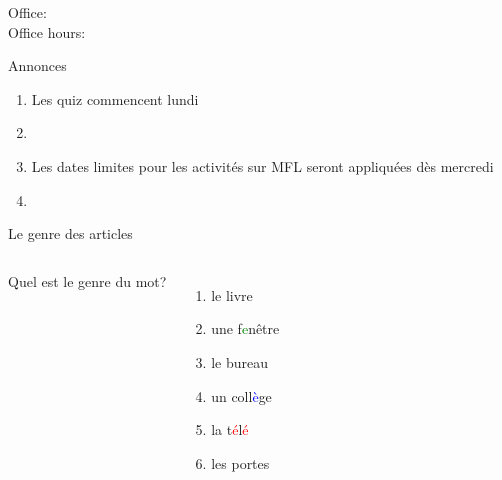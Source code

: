 \documentclass{beamer}
\subtitle[Présentons-nous et articles]{Présentons-nous et les articles}
\begin{document}
  \begin{frame}
    \titlepage
    \tiny{Office: \\
          Office hours: }
  \end{frame}

  \begin{frame}{Annonces }
    \begin{enumerate}
      \item Les quiz commencent lundi
      \item[] 
      \item Les dates limites pour les activités sur MFL seront appliquées dès mercredi
      \item[] 
    \end{enumerate}
  \end{frame}

  \begin{frame}{Le genre des articles }
    \begin{columns}
        Quel est le genre du mot? \\
        \begin{enumerate}
          \item \underline{} le livre
          \item \underline{} une f\textcolor<8->{green}{e}nêtre
          \item \underline{\uncover<4->{masculin}} le bureau
          \item \underline{} un coll\textcolor<8->{blue}{è}ge
          \item \underline{} la t\textcolor<8->{red}{é}l\textcolor<8->{red}{é}
          \item \underline{} les portes
        \end{enumerate}
    \end{columns}
  \end{frame}
\end{document}
